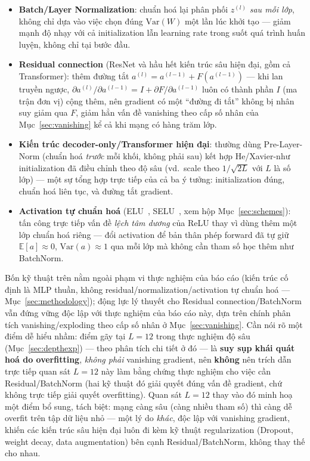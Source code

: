 \documentclass[12pt,a4paper]{article}
\begin{document}
\begin{itemize}
\item \textbf{Batch/Layer Normalization}: chuẩn hoá lại phân phối
  $z^{(l)}$ \emph{sau mỗi lớp}, không chỉ dựa vào việc chọn đúng
  $\mathrm{Var}(W)$ một lần lúc khởi tạo --- giảm mạnh độ nhạy với cả
  initialization lẫn learning rate trong suốt quá trình huấn luyện, không
  chỉ tại bước đầu.
\item \textbf{Residual connection} (ResNet và hầu hết kiến trúc sâu hiện
  đại, gồm cả Transformer): thêm đường tắt $a^{(l)}=a^{(l-1)}+F(a^{(l-1)})$
  --- khi lan truyền ngược, $\partial a^{(l)}/\partial a^{(l-1)} = I + \partial F/\partial a^{(l-1)}$
  luôn có thành phần $I$ (ma trận đơn vị) cộng thêm, nên gradient có một
  ``đường đi tắt'' không bị nhân suy giảm qua $F$, giảm hẳn vấn đề vanishing
  theo cấp số nhân của Mục~\ref{sec:vanishing} kể cả khi mạng có hàng trăm
  lớp.
\item \textbf{Kiến trúc decoder-only/Transformer hiện đại}: thường dùng
  Pre-Layer-Norm (chuẩn hoá \emph{trước} mỗi khối, không phải sau) kết
  hợp He/Xavier-như initialization đã điều chỉnh theo độ sâu (vd.\ scale
  theo $1/\sqrt{2L}$ với $L$ là số lớp) --- một sự tổng hợp trực tiếp của
  cả ba ý tưởng: initialization đúng, chuẩn hoá liên tục, và đường tắt
  gradient.
\item \textbf{Activation tự chuẩn hoá} (ELU~\citep{clevert2016elu},
  SELU~\citep{klambauer2017selu}, xem hộp Mục~\ref{sec:schemes}): tấn
  công trực tiếp vấn đề \emph{lệch tâm dương} của ReLU thay vì dùng thêm
  một lớp chuẩn hoá riêng --- đổi activation để bản thân phép forward đã
  tự giữ $\mathbb E[a]\approx0$, $\mathrm{Var}(a)\approx1$ qua mỗi lớp mà
  không cần tham số học thêm như BatchNorm.
\end{itemize}

Bốn kỹ thuật trên nằm ngoài phạm vi thực nghiệm của báo cáo (kiến trúc cố
định là MLP thuần, không residual/normalization/activation tự chuẩn hoá
--- Mục~\ref{sec:methodology}); động lực lý thuyết cho Residual
connection/BatchNorm vẫn đứng vững độc lập với thực nghiệm của báo cáo
này, dựa trên chính phân tích vanishing/exploding theo cấp số nhân ở
Mục~\ref{sec:vanishing}. Cần nói rõ một điểm dễ hiểu nhầm: điểm gãy tại
$L{=}12$ trong thực nghiệm độ sâu (Mục~\ref{sec:depthexp}) --- theo phân
tích chi tiết ở đó --- là \textbf{suy sụp khái quát hoá do overfitting},
\emph{không phải} vanishing gradient, nên \textbf{không} nên trích dẫn
trực tiếp quan sát $L{=}12$ này làm bằng chứng thực nghiệm cho việc cần
Residual/BatchNorm (hai kỹ thuật đó giải quyết đúng vấn đề gradient, chứ
không trực tiếp giải quyết overfitting). Quan sát $L{=}12$ thay vào đó
minh hoạ một điểm bổ sung, tách biệt: mạng càng sâu (càng nhiều tham số)
thì càng dễ overfit trên tập dữ liệu nhỏ --- một lý do \emph{khác}, độc
lập với vanishing gradient, khiến các kiến trúc sâu hiện đại luôn đi kèm
kỹ thuật regularization (Dropout, weight decay, data augmentation) bên
cạnh Residual/BatchNorm, không thay thế cho nhau.
\end{document}
